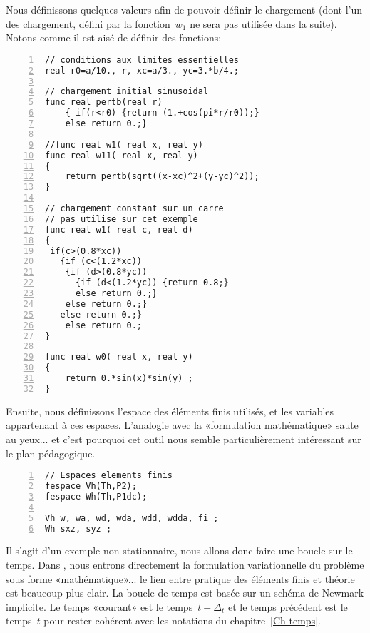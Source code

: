 \medskip
Nous définissons quelques valeurs afin de pouvoir définir le chargement (dont l'un des chargement,
défini par la fonction~$w_1$ ne sera pas utilisée dans la suite). Notons comme il est aisé de définir
des fonctions:

\color{gris}\scriptsize
\begin{multicols}{2}
\begin{Verbatim}[numbers=left,numbersep=3pt,firstnumber=last]
// conditions aux limites essentielles 
real r0=a/10., r, xc=a/3., yc=3.*b/4.; 

// chargement initial sinusoidal
func real pertb(real r)
	{ if(r<r0) {return (1.+cos(pi*r/r0));}
	else return 0.;}

//func real w1( real x, real y)
func real w11( real x, real y)
{
	return pertb(sqrt((x-xc)^2+(y-yc)^2)); 
}

// chargement constant sur un carre
// pas utilise sur cet exemple
func real w1( real c, real d)
{
 if(c>(0.8*xc))
   {if (c<(1.2*xc)) 
    {if (d>(0.8*yc))
      {if (d<(1.2*yc)) {return 0.8;}
      else return 0.;}
    else return 0.;}
   else return 0.;}
	else return 0.;
}

func real w0( real x, real y)
{
	return 0.*sin(x)*sin(y) ; 
}
\end{Verbatim}
\end{multicols}
\color{black}\normalsize

\medskip
Ensuite, nous définissons l'espace des éléments finis utilisés, et les variables appartenant à ces espaces.
L'analogie avec la «formulation mathématique» saute au yeux... et c'est pourquoi cet outil
nous semble particulièrement intéressant sur le plan pédagogique.

\color{gris}\scriptsize
\begin{Verbatim}[numbers=left,numbersep=3pt,firstnumber=last]
// Espaces elements finis 
fespace Vh(Th,P2); 
fespace Wh(Th,P1dc);

Vh w, wa, wd, wda, wdd, wdda, fi ; 
Wh sxz, syz ; 
\end{Verbatim}
\color{black}\normalsize

\medskip
Il s'agit d'un exemple non stationnaire, nous allons donc faire une boucle sur le temps. 
Dans \freefem, nous entrons directement la formulation variationnelle du problème sous forme «mathématique»... 
le lien entre pratique des éléments finis et théorie est beaucoup plus clair. 
La boucle de temps est basée sur un schéma de Newmark implicite. Le temps «courant»
est le temps~$t+\Delta_t$ et le temps précédent est le temps~$t$ pour rester cohérent avec
les notations du chapitre~\ref{Ch-temps}.

